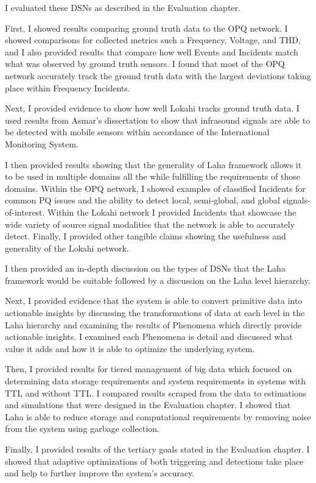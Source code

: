 I evaluated these DSNs as described in the Evaluation chapter.

First, I showed results comparing ground truth data to the OPQ network. I showed comparisons for collected metrics such a Frequency, Voltage, and THD, and I also provided results that compare how well Events and Incidents match what was observed by ground truth sensors. I found that most of the OPQ network accurately track the ground truth data with the largest deviations taking place within Frequency Incidents.

Next, I provided evidence to show how well Lokahi tracks ground truth data. I used results from Asmar's dissertation to show that infrasound signals are able to be detected with mobile sensors within accordance of the International Monitoring System.

I then provided results showing that the generality of Laha framework allows it to be used in multiple domains all the while fulfilling the requirements of those domains. Within the OPQ network, I showed examples of classified Incidents for common PQ issues and the ability to detect local, semi-global, and global signals-of-interest. Within the Lokahi network I provided Incidents that showcase the wide variety of source signal modalities that the network is able to accurately detect. Finally, I provided other tangible claims showing the usefulness and generality of the Lokahi network.

I then provided an in-depth discussion on the types of DSNs that the Laha framework would be suitable followed by a discussion on the Laha level hierarchy.

Next, I provided evidence that the system is able to convert primitive data into actionable insights by discussing the transformations of data at each level in the Laha hierarchy and examining the results of Phenomena which directly provide actionable insights. I examined each Phenomena is detail and discussed what value it adds and how it is able to optimize the underlying system.

Then, I provided results for tiered management of big data which focused on determining data storage requirements and system requirements in systems with TTL and without TTL. I compared results scraped from the data to estimations and simulations that were designed in the Evaluation chapter. I showed that Laha is able to reduce storage and computational requirements by removing noise from the system using garbage collection.

Finally, I provided results of the tertiary goals stated in the Evaluation chapter. I showed that adaptive optimizations of both triggering and detections take place and help to further improve the system's accuracy.

